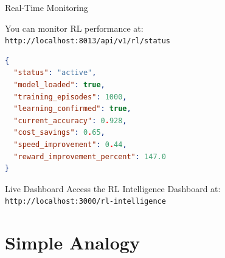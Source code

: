 \documentclass[aspectratio=169]{beamer}
\begin{document}
\begin{frame}[fragile]{Real-Time Monitoring \faDesktop}
\begin{block}{You can monitor RL performance at:}
\texttt{http://localhost:8013/api/v1/rl/status}
\end{block}

\vspace{0.3cm}

\begin{lstlisting}[style=codestyle,language=json]
{
  "status": "active",
  "model_loaded": true,
  "training_episodes": 1000,
  "learning_confirmed": true,
  "current_accuracy": 0.928,
  "cost_savings": 0.65,
  "speed_improvement": 0.44,
  "reward_improvement_percent": 147.0
}
\end{lstlisting}

\vspace{0.3cm}

\begin{alertblock}{Live Dashboard}
Access the RL Intelligence Dashboard at: \\
\texttt{http://localhost:3000/rl-intelligence}
\end{alertblock}
\end{frame}

\section{Simple Analogy}
\end{document}
